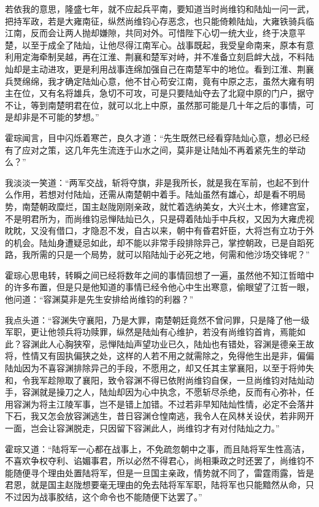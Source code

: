 若依我的意思，隆盛七年，就不应起兵平南，要知道当时尚维钧和陆灿一问一武，把持军政，若是大雍南征，纵然尚维钧心存恶念，也只能倚赖陆灿，大雍铁骑兵临江南，反而会让两人抛却嫌隙，共同对外。可惜陛下心切一统大业，终于决意平楚，以至于成全了陆灿，让他尽得江南军心。战事既起，我受皇命南来，原本有意利用定海牵制吴越，再在江淮、荆襄和楚军对峙，并不准备立刻启衅大战，不料陆灿却是主动进攻，更是利用战事连绵加强自己在南楚军中的地位。看到江淮、荆襄兵燹绵绵，我才确定陆灿心意，他不甘心苟安江南，竟有中原之志，虽然大雍有明主在位，又有名将雄兵，急切不可攻，可是只要陆灿夺去了北窥中原的门户，据守不让，等到南楚明君在位，就可以北上中原，虽然那可能是几十年之后的事情，可是却非是不可能的梦想。”

霍琮闻言，目中闪烁着寒芒，良久才道：“先生既然已经看穿陆灿心意，想必已经有了应对之策，这几年先生流连于山水之间，莫非是让陆灿不再着紧先生的举动么？”

我淡淡一笑道：“两军交战，斩将夺旗，非是我所长，就是我在军前，也起不到什么作用，若想对付陆灿，还需从南楚朝中着手。陆灿虽然有雄心，却是看不明局势，南楚朝政糜烂，国主赵陇刚刚亲政，就忙着选纳美女，大兴土木，修建宫室，不是明君所为，而尚维钧忌惮陆灿已久，只是碍着陆灿手中兵权，又因为大雍虎视眈眈，又没有借口，才隐忍不发，自古以来，朝中有昏君奸臣，大将岂有立功于外的机会。陆灿身遭疑忌如此，却不能以非常手段排除异己，掌控朝政，已是自蹈死路，我所需的只是一个局势，就可以陷陆灿于必死之地，何需和他沙场交锋呢？”

霍琮心思电转，转瞬之间已经将数年之间的事情回想了一遍，虽然他不知江哲暗中的许多布置，但是只是他知道的事情已经令他心中生出寒意，偷眼望了江哲一眼，他问道：“容渊莫非是先生安排给尚维钧的利器？”

我点头道：“容渊失守襄阳，乃是大罪，南楚朝廷竟然不曾问罪，只是降了他一级军职，更让他领兵将功赎罪，纵然是陆灿有心维护，若没有尚维钧首肯，焉能如此？容渊此人心胸狭窄，忌惮陆灿声望功业已久，陆灿也有错处，容渊是德亲王故将，性情又有固执偏狭之处，这样的人若不用之就需除之，免得他生出是非，偏偏陆灿因为不喜容渊排除异己的手段，不愿用之，却又任其主掌襄阳，以至于将帅失和，令我军趁隙取了襄阳，致令容渊不得已依附尚维钧自保，一旦尚维钧对陆灿动手，容渊就是操刀之人，陆灿却因为心中执念，不愿斩尽杀绝，反而有心弥补，任用容渊为将主江陵军事，岂不是错上加错。不过若非早知陆灿性情，必定不会落井下石，我又怎会放容渊逃生，昔日容渊仓惶南逃，我令人在风林关设伏，若非网开一面，岂会让容渊脱走，只因留下容渊此人，尚维钧才有对付陆灿之力。”

霍琮又道：“陆将军一心都在战事上，不免疏忽朝中之事，而且陆将军生性高洁，不喜欢争权夺利、谄媚事君，所以必然不得君心，尚相秉政之时还罢了，尚维钧不能随便寻个理由处置陆将军，但是一旦国主亲政，情势就不同了，雷霆雨露，皆是君恩，就是国主赵陇想要毫无理由的免去陆将军军职，陆将军也只能黯然从命，只不过因为战事胶结，这个命令也不能随便下达罢了。”

